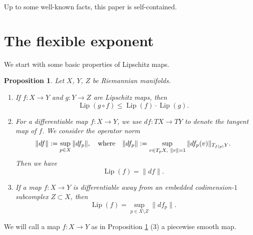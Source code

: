\documentclass{amsart}
\newcommand{\ra}{\rightarrow}
\newcommand{\lip}{\operatorname{Lip}}
\newtheorem{prop}[thm]{Proposition}
\begin{document}
Up to some well-known facts, this paper is self-contained.  

  
\section{The flexible exponent}\label{basics}

We start with some basic properties of Lipschitz maps.
 
\begin{prop}\label{LipschitzBasicProperties}
    Let $X$, $Y$, $Z$ be Riemannian manifolds.
    \begin{enumerate}
        \item If $f:X\ra Y$ and $g:Y\ra Z$ are Lipschitz maps, then
        \[
            \lip (g\circ f)\leq \lip (f)\cdot \lip (g).
        \]
        \item For a differentiable map  $f:X\ra Y$, we use $df:TX\ra TY$ to denote the tangent map of $f$. We consider the operator norm
        \[
            \|df\|:=\sup_{p\in X} \|df_p\|,\quad\text{where\quad } \|df_p\|:=\sup_{v\in T_pX,\ \|v\|=1} \|df_p (v)\|_{T_{f(p)}Y}.
          \]   Then we have
        \[
            \lip (f)=\|df\|.
        \]
        \item If a map $f:X\to Y$ is differentiable away from an embedded codimension-$1$ subcomplex $Z\subset X$, then $$\lip(f)=\sup _{p\in X\setminus Z}\|df_p\|.$$ 
    \end{enumerate}
\end{prop}

We will call a map $f:X\to Y$ as in Proposition \ref{LipschitzBasicProperties} (3) a piecewise smooth map.
    
\end{document}
